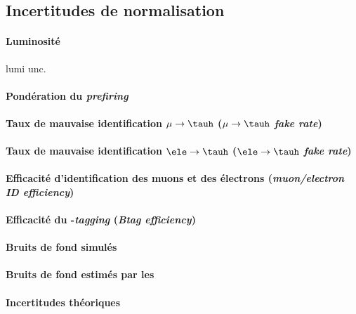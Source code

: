 \subsection{Incertitudes de normalisation}\label{chapter-HTT_analysis-section-systematics-normalization}

\paragraph{Luminosité}
lumi unc.~\cite{LumiTwiki}

\paragraph{Pondération du \emph{prefiring}}

\paragraph{Taux de mauvaise identification $\mu\to\tauh$ (\emph{$\mu\to\tauh$ fake rate})}

\paragraph{Taux de mauvaise identification $\ele\to\tauh$ (\emph{$\ele\to\tauh$ fake rate})}

\paragraph{Efficacité d'identification des muons et des électrons (\emph{muon/electron ID efficiency})}

\paragraph{Efficacité du \quarkb-\emph{tagging} (\emph{Btag efficiency})}

\paragraph{Bruits de fond simulés}

\paragraph{Bruits de fond estimés par les \fakefactors}

\paragraph{Incertitudes théoriques}
